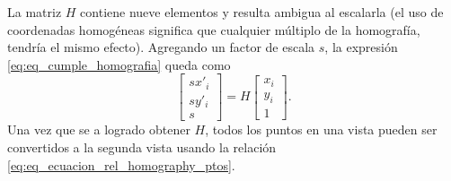 La matriz $\textit{H}$ contiene nueve elementos y resulta ambigua al escalarla (el uso de coordenadas homogéneas significa que cualquier múltiplo de la homografía, tendría el mismo efecto). Agregando un factor de escala $s$, la expresión \eqref{eq:eq_cumple_homografia} queda como
\begin{equation}
  \begin{bmatrix} sx'_i \\
  sy'_i\\
  s
  \end{bmatrix}=\textit{H}
  \begin{bmatrix}
  x_i\\
  y_i\\
  1
  \end{bmatrix}.
  \label{eq:eq_ecuacion_rel_homography_ptos}
\end{equation} %
Una vez que se a logrado obtener $\textit{H}$, todos los puntos en una vista pueden ser convertidos a la segunda vista usando la relación \ref{eq:eq_ecuacion_rel_homography_ptos}.
% 

